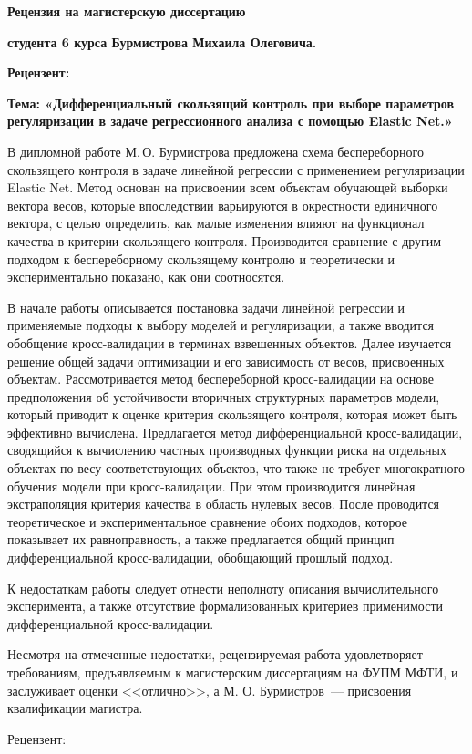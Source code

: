 \documentclass[11pt,a4paper]{amsart}
\begin{document}
\begin{center}
\end{center}

\bigskip

\begin{center}
\textbf{Рецензия на магистерскую диссертацию}
\end{center}

\textbf{студента 6 курса Бурмистрова Михаила Олеговича.}

\smallskip
\textbf{Рецензент:}

\smallskip
\textbf{Тема: «Дифференциальный скользящий контроль при выборе параметров регуляризации в задаче регрессионного анализа с помощью Elastic Net.»}

\thispagestyle{empty}

В дипломной работе М.\,О. Бурмистрова предложена схема беспереборного скользящего контроля в задаче линейной регрессии с применением регуляризации Elastic Net.
Метод основан на присвоении всем объектам обучающей выборки вектора весов, которые впоследствии варьируются в окрестности единичного вектора, с целью определить, как малые изменения влияют на функционал качества в критерии скользящего контроля.
Производится сравнение с другим подходом к беспереборному скользящему контролю и теоретически и экспериментально показано, как они соотносятся.

\vspace{4pt}
В начале работы описывается постановка задачи линейной регрессии и применяемые подходы к выбору моделей и регуляризации, а также вводится обобщение кросс-валидации в терминах взвешенных объектов.
Далее изучается решение общей задачи оптимизации и его зависимость от весов, присвоенных объектам.
Рассмотривается метод беспереборной кросс-валидации на основе предположения об устойчивости вторичных структурных параметров модели, который приводит к оценке критерия скользящего контроля, которая может быть эффективно вычислена. 
Предлагается метод дифференциальной кросс-валидации, сводящийся к вычислению частных производных функции риска на отдельных объектах по весу соответствующих объектов, что также не требует многократного обучения модели при кросс-валидации.
При этом производится линейная экстраполяция критерия качества в область нулевых весов.
После проводится теоретическое и экспериментальное сравнение обоих подходов, которое показывает их равноправность, а также предлагается общий принцип дифференциальной кросс-валидации, обобщающий прошлый подход.

\vspace{4pt}
К недостаткам работы следует отнести неполноту описания вычислительного эксперимента, а также отсутствие формализованных критериев применимости дифференциальной кросс-валидации.

\vspace{4pt}
Несмотря на отмеченные недостатки, рецензируемая работа удовлетворяет требованиям, предъявляемым к магистерским диссертациям на ФУПМ МФТИ, и заслуживает оценки <<отлично>>, а М. О. Бурмистров~--- присвоения квалификации магистра.

Рецензент: 
\end{document}
